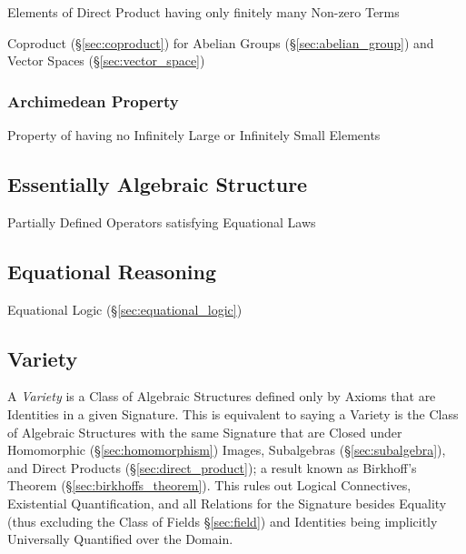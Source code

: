 Elements of Direct Product having only finitely many Non-zero Terms

Coproduct (\S\ref{sec:coproduct}) for Abelian Groups
(\S\ref{sec:abelian_group}) and Vector Spaces
(\S\ref{sec:vector_space})



\subsubsection{Archimedean Property}\label{sec:archimedean_property}

Property of having no Infinitely Large or Infinitely Small Elements



\subsection{Essentially Algebraic Structure}
\label{sec:essentially_algebraic}

Partially Defined Operators satisfying Equational Laws



\subsection{Equational Reasoning}\label{sec:equational_reasoning}

Equational Logic (\S\ref{sec:equational_logic})



\subsection{Variety}\label{sec:variety}

A \emph{Variety} is a Class of Algebraic Structures defined only by
Axioms that are Identities in a given Signature. This is equivalent to
saying a Variety is the Class of Algebraic Structures with the same
Signature that are Closed under Homomorphic (\S\ref{sec:homomorphism})
Images, Subalgebras (\S\ref{sec:subalgebra}), and Direct Products
(\S\ref{sec:direct_product}); a result known as Birkhoff's Theorem
(\S\ref{sec:birkhoffs_theorem}). This rules out Logical Connectives,
Existential Quantification, and all Relations for the Signature
besides Equality (thus excluding the Class of Fields
\S\ref{sec:field}) and Identities being implicitly Universally
Quantified over the Domain.

